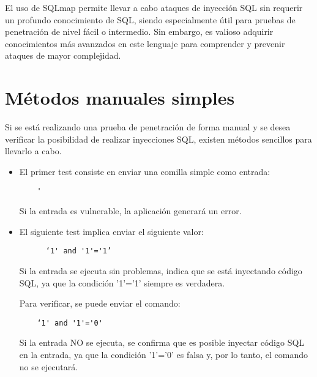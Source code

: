 \documentclass[11pt]{report}
\begin{document}
El uso de SQLmap permite llevar a cabo ataques de inyección SQL sin requerir un profundo conocimiento de SQL, siendo
especialmente útil para pruebas de penetración de nivel fácil o intermedio. Sin embargo, es valioso adquirir conocimientos
más avanzados en este lenguaje para comprender y prevenir ataques de mayor complejidad.

\section{Métodos manuales simples}
Si se está realizando una prueba de penetración de forma manual y se desea verificar la posibilidad de realizar inyecciones SQL,
existen métodos sencillos para llevarlo a cabo.

\begin{itemize}
  \item El primer test consiste en enviar una comilla simple como entrada: 
  \begin{verbatim}
    '
  \end{verbatim} 
  Si la entrada es vulnerable, la aplicación generará un error.

  \cleardoublepage

  \item El siguiente test implica enviar el siguiente valor:

  \begin{center}
    \begin{BVerbatim}
      ‘1' and '1'='1’
    \end{BVerbatim}
  \end{center}

Si la entrada se ejecuta sin problemas, indica que se está inyectando código SQL, ya que la condición '1'='1' siempre es verdadera.

Para verificar, se puede enviar el comando:
\begin{center}
  \begin{BVerbatim}
    ‘1' and '1'='0'
  \end{BVerbatim}
\end{center}

Si la entrada NO se ejecuta, se confirma que es posible inyectar código SQL en la entrada, ya que la condición '1'='0' es falsa y, por
lo tanto, el comando no se ejecutará.
\end{itemize}
\end{document}
